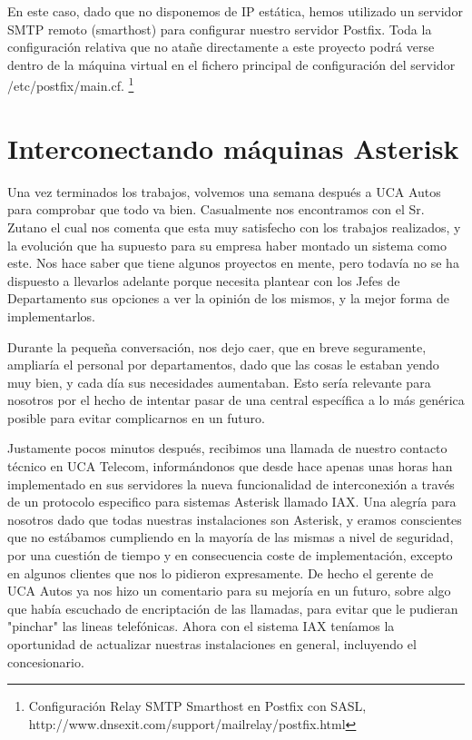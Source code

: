 En este caso, dado que no disponemos de IP estática, hemos utilizado un servidor SMTP remoto (smarthost) para configurar nuestro servidor Postfix. Toda la configuración relativa que no atañe directamente a este proyecto podrá verse dentro de la máquina virtual en el fichero principal de configuración del servidor /etc/postfix/main.cf. \footnote{Configuración Relay SMTP Smarthost en Postfix con SASL, http://www.dnsexit.com/support/mailrelay/postfix.html}

\newpage

\color[rgb]{0,0,1}

\section{Interconectando máquinas Asterisk}

Una vez terminados los trabajos, volvemos una semana después a UCA Autos para comprobar que todo va bien. Casualmente nos encontramos con el Sr. Zutano el cual nos comenta que esta muy satisfecho con los trabajos realizados, y la evolución que ha supuesto para su empresa haber montado un sistema como este. Nos hace saber que tiene algunos proyectos en mente, pero todavía no se ha dispuesto a llevarlos adelante porque necesita plantear con los Jefes de Departamento sus opciones a ver la opinión de los mismos, y la mejor forma de implementarlos. 

Durante la pequeña conversación, nos dejo caer, que en breve seguramente, ampliaría el personal por departamentos, dado que las cosas le estaban yendo muy bien, y cada día sus necesidades aumentaban. Esto sería relevante para nosotros por el hecho de intentar pasar de una central específica a lo más genérica posible para evitar complicarnos en un futuro.

Justamente pocos minutos después, recibimos una llamada de nuestro contacto técnico en UCA Telecom, informándonos que desde hace apenas unas horas han implementado en sus servidores la nueva funcionalidad de interconexión a través de un protocolo especifico para sistemas Asterisk llamado IAX. Una alegría para nosotros dado que todas nuestras instalaciones son Asterisk, y eramos conscientes que no estábamos cumpliendo en la mayoría de las mismas a nivel de seguridad, por una cuestión de tiempo y en consecuencia coste de implementación, excepto en algunos clientes que nos lo pidieron expresamente. De hecho el gerente de UCA Autos ya nos hizo un comentario para su mejoría en un futuro, sobre algo que había escuchado de encriptación de las llamadas, para evitar que le pudieran "pinchar" las lineas telefónicas. Ahora con el sistema IAX teníamos la oportunidad de actualizar nuestras instalaciones en general, incluyendo el concesionario.

